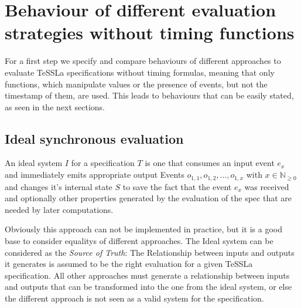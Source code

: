 
\section{Behaviour of different evaluation strategies without timing functions}
\label{sec:concepts:behaviour_without_timing}

For a first step we specify and compare behaviours of different approaches to evaluate TeSSLa specifications without timing formulas,
meaning that only functions, which manipulate values or the presence of events, but not the timestamp of them, are used.
This leads to behaviours that can be easily stated, as seen in the next sections.

\subsection{Ideal synchronous evaluation}
\label{sec:concepts:behaviour_without_timing:ideal}

An ideal system \(I\) for a specification \(T\) is one that consumes an input event \(e_x\) and immediately emits
appropriate output Events \(o_{1,1}, o_{1,2}, \dots , o_{1,x}\) with \(x \in \mathbb{N}_{\ge0}\) and changes it's internal
state \(S\) to save the fact that the event \(e_x\) was received and optionally other properties generated by the
evaluation of the spec that are needed by later computations.

Obviously this approach can not be implemented in practice, but it is a good base to consider equalitys of different approaches.
The Ideal system can be considered as the \emph{Source of Truth}: The Relationship between inputs and outputs it generates
is assumed to be the right evaluation for a given TeSSLa specification.
All other approaches must generate a relationship between inputs and outputs that can be transformed into the one from the ideal system,
or else the different approach is not seen as a valid system for the specification.

